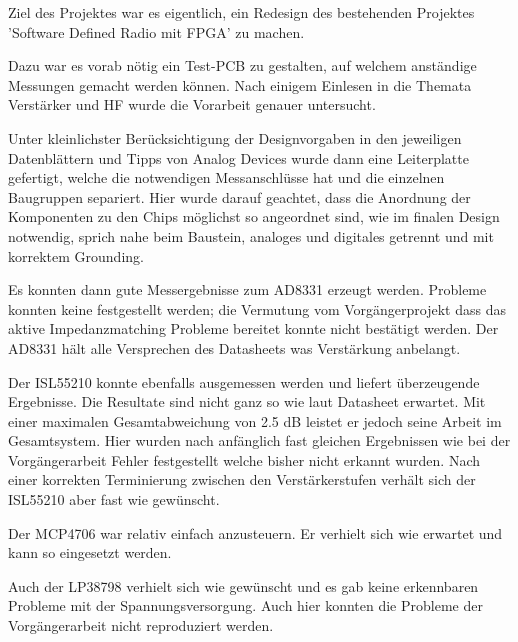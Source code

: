 Ziel des Projektes war es eigentlich, ein Redesign des bestehenden Projektes 'Software Defined Radio mit FPGA' zu machen.

Dazu war es vorab nötig ein Test-PCB zu gestalten, auf welchem anständige Messungen gemacht werden können.
Nach einigem Einlesen in die Themata Verstärker und HF wurde die Vorarbeit genauer untersucht.

Unter kleinlichster Berücksichtigung der Designvorgaben in den jeweiligen Datenblättern und Tipps von Analog Devices\cite{StayingWellGrounded2012} wurde dann eine Leiterplatte gefertigt, welche die notwendigen Messanschlüsse hat und die einzelnen Baugruppen separiert. Hier wurde darauf geachtet, dass die Anordnung der Komponenten zu den Chips möglichst so angeordnet sind, wie im finalen Design notwendig, sprich nahe beim Baustein, analoges und digitales getrennt und mit korrektem Grounding.

Es konnten dann gute Messergebnisse zum AD8331 erzeugt werden. Probleme konnten keine festgestellt werden; die Vermutung vom Vorgängerprojekt dass das aktive Impedanzmatching Probleme bereitet konnte nicht bestätigt werden. Der AD8331 hält alle Versprechen des Datasheets was Verstärkung anbelangt.

Der ISL55210 konnte ebenfalls ausgemessen werden und liefert überzeugende Ergebnisse. Die Resultate sind nicht ganz so wie laut Datasheet erwartet. Mit einer maximalen Gesamtabweichung von 2.5 dB leistet er jedoch seine Arbeit im Gesamtsystem. Hier wurden nach anfänglich fast gleichen Ergebnissen wie bei der Vorgängerarbeit Fehler festgestellt welche bisher nicht erkannt wurden. Nach einer korrekten Terminierung zwischen den Verstärkerstufen verhält sich der ISL55210 aber fast wie gewünscht.

Der MCP4706 war relativ einfach anzusteuern. Er verhielt sich wie erwartet und kann so eingesetzt werden.

Auch der LP38798 verhielt sich wie gewünscht und es gab keine erkennbaren Probleme mit der Spannungsversorgung. Auch hier konnten die Probleme der Vorgängerarbeit nicht reproduziert werden.